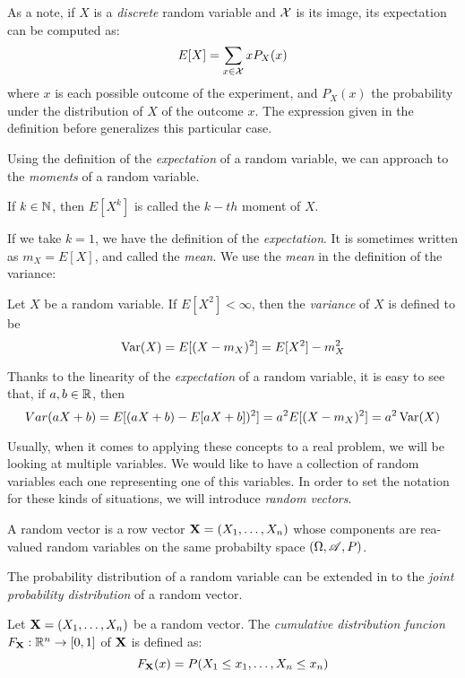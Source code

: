 As a note, if $X$ is a \emph{discrete} random variable and $\mathcal{X}$ is its image, its expectation can be computed as:
$$
E[X] = \sum_{x \in \mathcal{X}} x  P_X(x)
$$
where $x$ is each possible outcome of the experiment, and $P_X(x)$ the probability under the distribution of $X$ of the outcome $x$. The expression given in the definition before generalizes this particular case.

Using the definition of the \emph{expectation} of a random variable, we can approach to the \emph{moments} of a random variable.

\begin{ndef}
If $k \in \mathbb N$, then $E[X^k]$ is called the $k-th$ moment of $X$.
\end{ndef}
If we take $k = 1$, we have the definition of the \emph{expectation}. It is sometimes written as $m_X = E[X]$, and called the \emph{mean}. We use the \emph{mean} in the definition of the variance:

\begin{ndef}
Let $X$ be a random variable. If $E[X^2] < \infty$, then the \emph{variance} of $X$ is defined to be
$$
\operatorname*{Var}(X) = E[(X - m_X)^2] = E[X^2] - m_X^2 
$$
\end{ndef}

Thanks to the linearity of the \emph{expectation} of a random variable, it is easy to see that, if $a,b \in \mathbb{R}$, then
$$
Var(aX + b) = E[(aX + b) - E[aX + b])^2] = a^2E[(X - m_X)^2] = a^2 \operatorname*{Var}(X)
$$



Usually, when it comes to applying these concepts to a real problem, we will be looking at multiple variables. We would like to have a collection of random variables each one representing one of this variables.
In order to set the notation for these kinds of situations, we will introduce \emph{random vectors}.

\begin{ndef}
  A random vector is a row vector $\mathbf{X} = (X_1,\dots,X_n)$ whose components are rea-valued random variables on the same probabilty space $(\Omega,\mathscr{A},P)$.
\end{ndef}

The probability distribution of a random variable can be extended in to the \emph{joint probability distribution} of a random vector.

\begin{ndef}
Let $\mathbf{X} = (X_1,\dots,X_n)$ be a random vector. The \emph{cumulative distribution funcion} $F_{\mathbf{X}} : \mathbb{R}^n \to [0,1]$ of $\mathbf{X}$ is defined as:
$$
F_{\mathbf{X}}(x) = P(X_1 \leq x_1 , \dots, X_n \leq x_n)
$$
\end{ndef}

